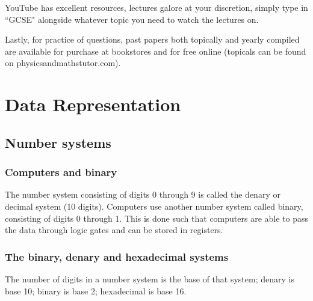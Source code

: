 \documentclass{article}
\begin{document}
YouTube has excellent resources, lectures galore
at your discretion, simply type in ``GCSE" alongside whatever topic you need to watch
the lectures on.

Lastly, for practice of questions, past papers both topically and yearly compiled are
available for purchase at bookstores and for free online (topicals can be found on
physicsandmathstutor.com).
\tableofcontents \newpage
\section {Data Representation}
\subsection{Number systems}

\subsubsection{Computers and binary}
The number system consisting of digits 0 through 9 is called the denary or decimal system
(10 digits). Computers use another number system called binary, consisting of digits
0 through 1. This is done such that computers are able to pass the data through logic 
gates and can be stored in registers.

\subsubsection{The binary, denary and hexadecimal systems}
The number of digits in a number system is the base of that system; denary is base 10;
binary is base 2; hexadecimal is base 16.
\end{document}
